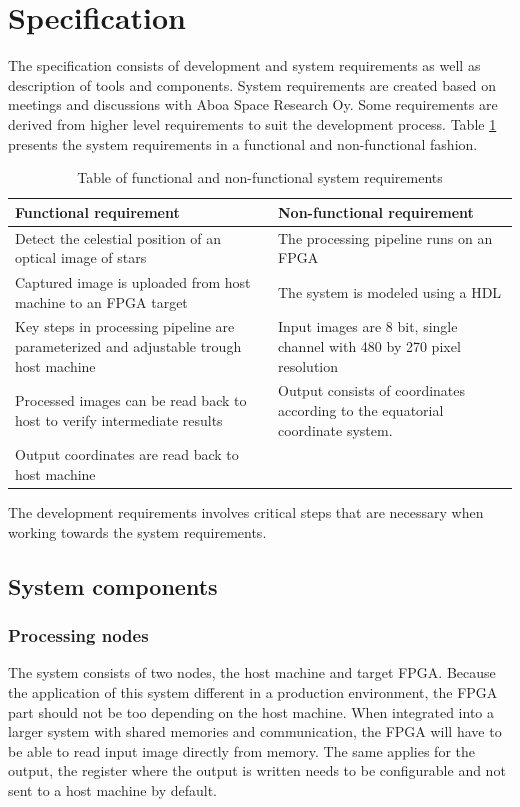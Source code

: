 \documentclass[12pt]{report}
\begin{document}
\section{Specification}

The specification consists of development and system requirements as well as description of tools and components. System requirements are created based on meetings and discussions with Aboa Space Research Oy. Some requirements are derived from higher level requirements to suit the development process. Table \ref{table:1} presents the system requirements in a functional and non-functional fashion.

\begin{table}
    \begin{tabular}{|p{6.75cm}|p{6.75cm}|}
        \hline
        \textbf{Functional requirement} & \textbf{Non-functional requirement} \\
        \hline
        \hline
        Detect the celestial position of an optical image of stars & The processing pipeline runs on an FPGA \\
        \hline
        Captured image is uploaded from host machine to an FPGA target & The system is modeled using a HDL \\
        \hline
        Key steps in processing pipeline are parameterized and adjustable trough host machine & Input images are 8 bit, single channel with 480 by 270 pixel resolution \\
        \hline
        Processed images can be read back to host to verify intermediate results & Output consists of coordinates according to the equatorial coordinate system. \\
        \hline
        Output coordinates are read back to host machine & \\
        \hline
    \end{tabular}
    \caption{Table of functional and non-functional system requirements}
    \label{table:1}
\end{table}

The development requirements involves critical steps that are necessary when working towards the system requirements.

\subsection{System components}
\subsubsection{Processing nodes}
The system consists of two nodes, the host machine and target FPGA. Because the application of this system different in a production environment, the FPGA part should not be too depending on the host machine. When integrated into a larger system with shared memories and communication, the FPGA will have to be able to read input image directly from memory. The same applies for the output, the register where the output is written needs to be configurable and not sent to a host machine by default.
\end{document}
